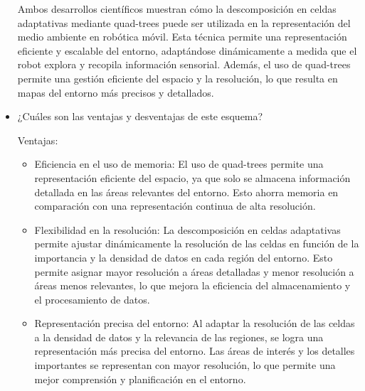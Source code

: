 \documentclass{article}
\begin{document}
\begin{itemize}
\begin{enumerate}
  \end{enumerate}

  Ambos desarrollos científicos muestran cómo la descomposición en celdas adaptativas mediante quad-trees puede ser utilizada en la representación del medio ambiente en robótica móvil. Esta técnica permite una representación eficiente y escalable del entorno, adaptándose dinámicamente a medida que el robot explora y recopila información sensorial. Además, el uso de quad-trees permite una gestión eficiente del espacio y la resolución, lo que resulta en mapas del entorno más precisos y detallados.
  
\item {¿Cuáles son las ventajas y desventajas de este esquema?}


  Ventajas:
  \begin{itemize}
  \item Eficiencia en el uso de memoria: El uso de quad-trees permite una representación eficiente del espacio, ya que solo se almacena información detallada en las áreas relevantes del entorno. Esto ahorra memoria en comparación con una representación continua de alta resolución.
  \item Flexibilidad en la resolución: La descomposición en celdas adaptativas permite ajustar dinámicamente la resolución de las celdas en función de la importancia y la densidad de datos en cada región del entorno. Esto permite asignar mayor resolución a áreas detalladas y menor resolución a áreas menos relevantes, lo que mejora la eficiencia del almacenamiento y el procesamiento de datos.
  \item Representación precisa del entorno: Al adaptar la resolución de las celdas a la densidad de datos y la relevancia de las regiones, se logra una representación más precisa del entorno. Las áreas de interés y los detalles importantes se representan con mayor resolución, lo que permite una mejor comprensión y planificación en el entorno.
  \end{itemize}


\end{itemize}
\end{document}
